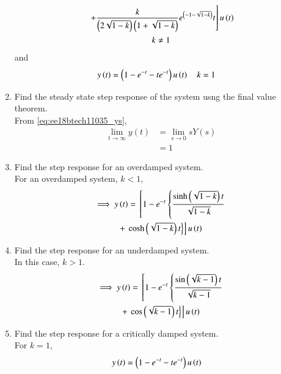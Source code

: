 \begin{enumerate}[label=\thesubsection.\arabic*.,ref=\thesubsection.\theenumi]
\begin{multline}
\\
{}\left.+\frac{k}{\left(2\sqrt{1-k}\right)\left(1+\sqrt{1-k}\right)}{e^{\left(-1-\sqrt{1-k}\right)}t}\right]u\left(t\right)
\\
k \ne 1
\label{eq:y(t)}
\end{multline}
and
\begin{align}
y\left(t\right)&=\left(1-e^{-t}-te^{-t}\right)u\left(t\right) \quad k=1
\end{align}
%
\item Find the steady state step response of the system usng the final value theorem.
\\
\solution From \eqref{eq:ee18btech11035_ys},
%
\begin{align}
\lim_{t\to\infty} y(t)&=\lim_{s\to0} sY(s)\\
&=1
\end{align}
\item Find the step response for an overdamped system.
\\
\solution For an overdamped system, $k < 1$,
\begin{multline}
\implies         y\left(t\right) = {}\left[1 - e^{-t}\left\{\frac{\sinh{\ensuremath{\left(\sqrt{1-k}\right)}t}}{{\sqrt{1-k}}}\right.\right.
\\
+ {}\left.\left.\cosh\left(\sqrt{1-k}\right)t\right\}\right]u\left(t\right)
\end{multline}
\item Find the step response for an underdamped system.
\\
\solution In this case, $k > 1$.
%
\begin{multline}
\implies         y\left(t\right) = {}\left[1 - e^{-t}\left\{\frac{\sin{\ensuremath{\left(\sqrt{k-1}\right)}t}}{{\sqrt{k-1}}}\right.\right.
\\
+ {}\left.\left.\cos\left(\sqrt{k-1}\right)t\right\}\right]u\left(t\right)
\end{multline}
\item Find the step response for a critically damped system.
\\
\solution For $k=1$,
\begin{align}
y\left(t\right)&=\left(1-e^{-t}-te^{-t}\right)u\left(t\right)    
\end{align}



\end{enumerate}
